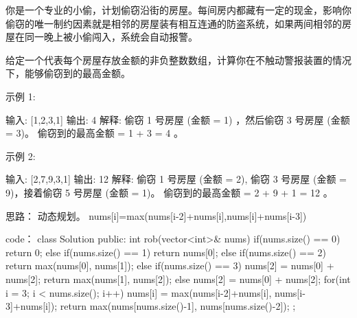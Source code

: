 你是一个专业的小偷，计划偷窃沿街的房屋。每间房内都藏有一定的现金，影响你偷窃的唯一制约因素就是相邻的房屋装有相互连通的防盗系统，如果两间相邻的房屋在同一晚上被小偷闯入，系统会自动报警。

给定一个代表每个房屋存放金额的非负整数数组，计算你在不触动警报装置的情况下，能够偷窃到的最高金额。

示例 1:

输入: [1,2,3,1]
输出: 4
解释: 偷窃 1 号房屋 (金额 = 1) ，然后偷窃 3 号房屋 (金额 = 3)。
     偷窃到的最高金额 = 1 + 3 = 4 。

示例 2:

输入: [2,7,9,3,1]
输出: 12
解释: 偷窃 1 号房屋 (金额 = 2), 偷窃 3 号房屋 (金额 = 9)，接着偷窃 5 号房屋 (金额 = 1)。
     偷窃到的最高金额 = 2 + 9 + 1 = 12 。































思路：
动态规划。
nums[i]=max(nums[i-2]+nums[i],nums[i]+nums[i-3])


























code：
class Solution {
public:
    int rob(vector<int>& nums) {
        if(nums.size() == 0) return 0;
        else if(nums.size() == 1) return nums[0];
        else if(nums.size() == 2) return max(nums[0], nums[1]);
        else if(nums.size() == 3)
        {
            nums[2] = nums[0] + nums[2];
            return max(nums[1], nums[2]);
        }
        else
        {
            nums[2] = nums[0] + nums[2];
            for(int i = 3; i < nums.size(); i++)
            {
                nums[i] = max(nums[i-2]+nums[i], nums[i-3]+nums[i]);
            }
        }
        return max(nums[nums.size()-1], nums[nums.size()-2]);
    }
};
